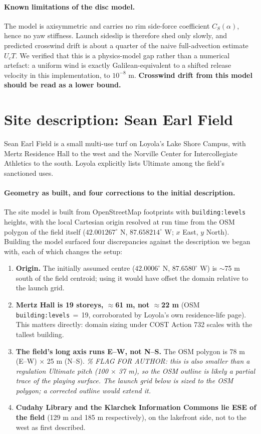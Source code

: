 \documentclass[11pt,letterpaper]{article}
\begin{document}
\paragraph{Known limitations of the disc model.} The model is axisymmetric and
carries no rim side-force coefficient $C_S(\alpha)$, hence no yaw stiffness.
Launch sideslip is therefore shed only slowly, and predicted crosswind drift is
about a quarter of the naive full-advection estimate $U_c T$. We verified that
this is a physics-model gap rather than a numerical artefact: a uniform wind is
exactly Galilean-equivalent to a shifted release velocity in this
implementation, to $10^{-8}$ m. \textbf{Crosswind drift from this model should
be read as a lower bound.}

\section{Site description: Sean Earl Field}

Sean Earl Field is a small multi-use turf on Loyola's Lake Shore Campus, with
Mertz Residence Hall to the west and the Norville Center for Intercollegiate
Athletics to the south. Loyola explicitly lists Ultimate among the field's
sanctioned uses.

\paragraph{Geometry as built, and four corrections to the initial description.}
The site model is built from OpenStreetMap footprints with
\texttt{building:levels} heights, with the local Cartesian origin resolved at
run time from the OSM polygon of the field itself
($42.001267^\circ$ N, $87.658214^\circ$ W; $x$ East, $y$ North). Building the
model surfaced four discrepancies against the description we began with, each
of which changes the setup:

\begin{enumerate}[leftmargin=*,itemsep=2pt]
  \item \textbf{Origin.} The initially assumed centre
    ($42.0006^\circ$ N, $87.6580^\circ$ W) is $\sim$75 m south of the field
    centroid; using it would have offset the domain relative to the launch grid.
  \item \textbf{Mertz Hall is 19 storeys, $\approx$61 m, not $\approx$22 m}
    (OSM \texttt{building:levels}\,$=$\,19, corroborated by Loyola's own
    residence-life page). This matters directly: domain sizing under COST
    Action 732 scales with the tallest building.
  \item \textbf{The field's long axis runs E--W, not N--S.} The OSM polygon is
    78 m (E--W) $\times$ 25 m (N--S). \emph{\% FLAG FOR AUTHOR: this is also
    smaller than a regulation Ultimate pitch (100 $\times$ 37 m), so the OSM
    outline is likely a partial trace of the playing surface. The launch grid
    below is sized to the OSM polygon; a corrected outline would extend it.}
  \item \textbf{Cudahy Library and the Klarchek Information Commons lie ESE of
    the field} (129 m and 185 m respectively), on the lakefront side, not to
    the west as first described.
\end{enumerate}
\end{document}
